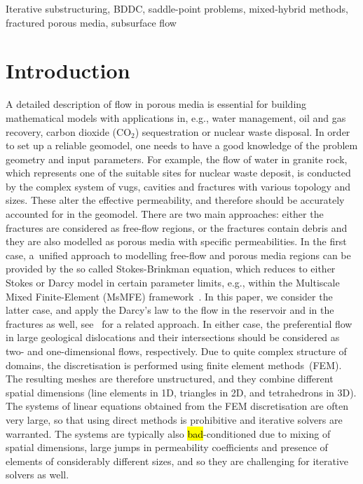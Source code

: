 \keywords
{Iterative substructuring, BDDC, saddle-point problems, mixed-hybrid methods, fractured porous media,
subsurface flow}%
\maketitle


\section{Introduction}

\label{sec:introduction} A detailed description of flow in porous media is
essential for building mathematical models with applications in, e.g., water
management, oil and gas recovery, carbon dioxide (CO$_{2}$) sequestration or
nuclear waste disposal. In order to set up a reliable geomodel, one needs to
have a good knowledge of the problem geometry and input parameters.
For example, the flow of water in granite rock, which represents one of the
suitable sites for nuclear waste deposit, is conducted by the complex system
of vugs, cavities and fractures with various topology and sizes. These alter
the effective permeability, and therefore should be accurately accounted for
in the geomodel. There are two main approaches: either the fractures are
considered as free-flow regions, or the fractures contain debris and they are
also modelled as porous media with specific permeabilities. In the first case,
a~unified approach to modelling free-flow and porous media regions can be
provided by the so called Stokes-Brinkman equation, which reduces to either
Stokes or Darcy model in certain parameter limits, e.g., within the Multiscale
Mixed Finite-Element (MsMFE) framework~\cite{Gulbransen-2010-MMF}. In this
paper, we consider the latter case, and apply the Darcy's law to the flow in
the reservoir and in the fractures as well, see~\cite{Martin-2005-MFB} for a
related approach. In either case, the preferential flow in large geological
dislocations and their intersections should be considered as two- and
one-dimensional flows, respectively. Due to quite complex structure of
domains, the discretisation is performed using finite element methods~(FEM).
The resulting meshes are therefore unstructured, and they combine different
spatial dimensions (line elements in 1D, triangles in 2D, and tetrahedrons in
3D). The systems of linear equations obtained from the FEM discretisation are
often very large, so that using direct methods is prohibitive and iterative
solvers are warranted. The systems are typically also
\hl{bad}-conditioned due to mixing of spatial dimensions, large jumps in
permeability coefficients and presence of elements of considerably different
sizes, and so they are challenging for iterative solvers as well.

